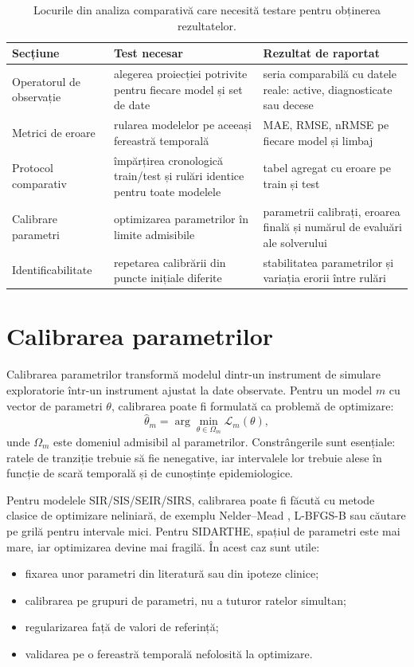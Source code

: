 \begin{table}[t]
\centering
\caption[Teste necesare: comparație numerică]{Locurile din analiza comparativă care necesită testare pentru obținerea rezultatelor.}
\label{tab:teste_necesare_comparatie}
\begin{tabularx}{0.96\textwidth}{lX X}
\toprule
\textbf{Secțiune} & \textbf{Test necesar} & \textbf{Rezultat de raportat} \\
\midrule
Operatorul de observație & alegerea proiecției potrivite pentru fiecare model și set de date & seria comparabilă cu datele reale: active, diagnosticate sau decese \\
Metrici de eroare & rularea modelelor pe aceeași fereastră temporală & MAE, RMSE, nRMSE pe fiecare model și limbaj \\
Protocol comparativ & împărțirea cronologică train/test și rulări identice pentru toate modelele & tabel agregat cu eroare pe train și test \\
Calibrare parametri & optimizarea parametrilor în limite admisibile & parametrii calibrați, eroarea finală și numărul de evaluări ale solverului \\
Identificabilitate & repetarea calibrării din puncte inițiale diferite & stabilitatea parametrilor și variația erorii între rulări \\
\bottomrule
\end{tabularx}
\end{table}

\section{Calibrarea parametrilor}
\label{sec:calibrare_parametri}

Calibrarea parametrilor transformă modelul dintr-un instrument de simulare
exploratorie într-un instrument ajustat la date observate. Pentru un model
$m$ cu vector de parametri $\theta$, calibrarea poate fi formulată ca problemă
de optimizare:
\begin{equation}
\hat{\theta}_m =
\arg\min_{\theta \in \Omega_m} \mathcal{L}_m(\theta),
\end{equation}
unde $\Omega_m$ este domeniul admisibil al parametrilor. Constrângerile sunt
esențiale: ratele de tranziție trebuie să fie nenegative, iar intervalele lor
trebuie alese în funcție de scară temporală și de cunoștințe epidemiologice.

Pentru modelele SIR/SIS/SEIR/SIRS, calibrarea poate fi făcută cu metode clasice
de optimizare neliniară, de exemplu Nelder--Mead \cite{nelder1965simplex},
L-BFGS-B sau căutare pe grilă pentru intervale mici. Pentru SIDARTHE, spațiul de
parametri este mai mare, iar optimizarea devine mai fragilă. În acest caz sunt
utile:
\begin{itemize}
    \item fixarea unor parametri din literatură sau din ipoteze clinice;
    \item calibrarea pe grupuri de parametri, nu a tuturor ratelor simultan;
    \item regularizarea față de valori de referință;
    \item validarea pe o fereastră temporală nefolosită la optimizare.
\end{itemize}

